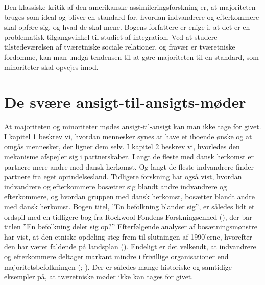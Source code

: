 \documentclass[
]{book}
\begin{document}
Den klassiske kritik af den amerikanske assimileringsforskning er, at majoriteten bruges som ideal og bliver en standard for, hvordan indvandrere og efterkommere skal opføre sig, og hvad de skal mene. Bogens forfattere er enige i, at det er en problematisk tilgangsvinkel til studiet af integration. Ved at studere tilstedeværelsen af tværetniske sociale relationer, og fravær er tværetniske fordomme, kan man undgå tendensen til at gøre majoriteten til en standard, som minoriteter skal opvejes imod.

\section{De svære ansigt-til-ansigts-møder}\label{de-svuxe6re-ansigt-til-ansigts-muxf8der}

At majoriteten og minoriteter mødes ansigt-til-ansigt kan man ikke tage for givet. I \hyperref[kap1]{kapitel 1} beskrev vi, hvordan mennesker synes at have et iboende ønske og at omgås mennesker, der ligner dem selv. I \hyperref[kap2]{kapitel 2} beskrev vi, hvorledes den mekanisme afspejler sig i partnerskaber. Langt de fleste med dansk herkomst er partnere mere andre med dansk herkomst. Og langt de fleste indvandrere finder partnere fra eget oprindelsesland. Tidligere forskning har også vist, hvordan indvandrere og efterkommere bosætter sig blandt andre indvandrere og efterkommere, og hvordan gruppen med dansk herkomst, bosætter blandt andre med dansk herkomst. Bogen titel, ''En befolkning blander sig'', er således lidt et ordspil med en tidligere bog fra Rockwool Fondens Forskningsenhed (), der bar titlen ''En befolkning deler sig op?'' Efterfølgende analyser af bosætningsmønstre har vist, at den etniske opdeling steg frem til slutningen af 1990'erne, hvorefter den har været faldende på landsplan (). Endeligt er det velkendt, at indvandrere og efterkommere deltager markant mindre i frivillige organisationer end majoritetsbefolkningen (; ). Der er således mange historiske og samtidige eksempler på, at tværetniske møder ikke kan tages for givet.
\end{document}
